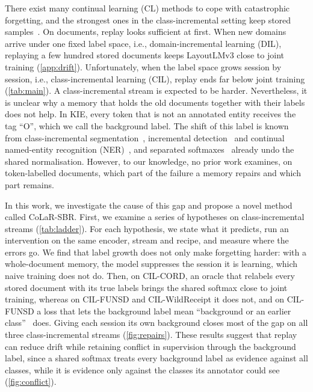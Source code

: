 \documentclass[10pt,twocolumn,letterpaper]{article}
\begin{document}
There exist many continual learning (CL) methods to cope with catastrophic forgetting, and the strongest ones in the class-incremental setting keep stored samples~\citep{masana2022class,wang2024survey}. On documents, replay looks sufficient at first. When new domains arrive under one fixed label space, i.e., domain-incremental learning (DIL), replaying a few hundred stored documents keeps LayoutLMv3 close to joint training (\cref{app:drift}). Unfortunately, when the label space grows session by session, i.e., class-incremental learning (CIL), replay ends far below joint training (\cref{tab:main}). A class-incremental stream is expected to be harder. Nevertheless, it is unclear why a memory that holds the old documents together with their labels does not help. In KIE, every token that is not an annotated entity receives the tag ``O'', which we call the background label. The shift of this label is known from class-incremental segmentation~\citep{cermelli2020mib,douillard2021plop}, incremental detection~\citep{liu2023abr,mo2024bpf} and continual named-entity recognition (NER)~\citep{monaikul2021extendner,zhang2023cpfd}, and separated softmaxes~\citep{ahn2021ssil,kim2022more,liu2023ice} already undo the shared normalisation. However, to our knowledge, no prior work examines, on token-labelled documents, which part of the failure a memory repairs and which part remains.



In this work, we investigate the cause of this gap and propose a novel method called CoLaR-SBR. First, we examine a series of hypotheses on class-incremental streams (\cref{tab:ladder}). For each hypothesis, we state what it predicts, run an intervention on the same encoder, stream and recipe, and measure where the errors go. We find that label growth does not only make forgetting harder: with a whole-document memory, the model suppresses the session it is learning, which naive training does not do. Then, on CIL-CORD, an oracle that relabels every stored document with its true labels brings the shared softmax close to joint training, whereas on CIL-FUNSD and CIL-WildReceipt it does not, and on CIL-FUNSD a loss that lets the background label mean ``background or an earlier class''~\citep{cermelli2020mib} does. Giving each session its own background closes most of the gap on all three class-incremental streams (\cref{fig:repairs}). These results suggest that replay can reduce drift while retaining conflict in supervision through the background label, since a shared softmax treats every background label as evidence against all classes, while it is evidence only against the classes its annotator could see (\cref{fig:conflict}).
\end{document}
